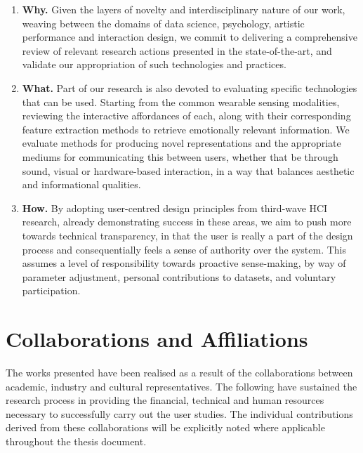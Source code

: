 
\begin{enumerate}
    \item \textbf{Why.} Given the layers of novelty and interdisciplinary nature of our work, weaving between the domains of data science, psychology, artistic performance and interaction design, we commit to delivering a comprehensive review of relevant research actions presented in the state-of-the-art, and validate our appropriation of such technologies and practices.

    \item \textbf{What.} Part of our research is also devoted to evaluating specific technologies that can be used. Starting from the common wearable sensing modalities, reviewing the interactive affordances of each, along with their corresponding feature extraction methods to retrieve emotionally relevant information. We evaluate methods for producing novel representations and the appropriate mediums for communicating this between users, whether that be through sound, visual or hardware-based interaction, in a way that balances aesthetic and informational qualities.

    \item \textbf{How.} By adopting user-centred design principles from third-wave HCI research, already demonstrating success in these areas, we aim to push more towards technical transparency, in that the user is really a part of the design process and consequentially feels a sense of authority over the system. This assumes a level of responsibility towards proactive sense-making, by way of parameter adjustment, personal contributions to datasets, and voluntary participation.
\end{enumerate}

\section{Collaborations and Affiliations}

The works presented have been realised as a result of the collaborations between academic, industry and cultural representatives. The following have sustained the research process in providing the financial, technical and human resources necessary to successfully carry out the user studies. The individual contributions derived from these collaborations will be explicitly noted where applicable throughout the thesis document.

